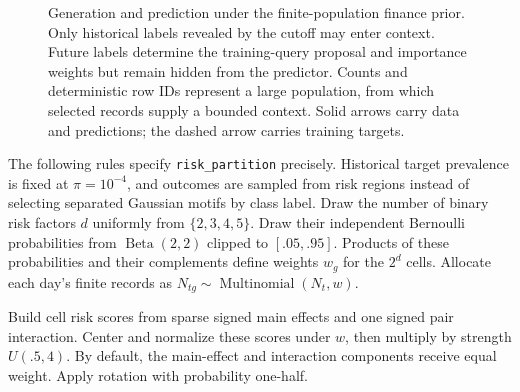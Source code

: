 \documentclass[11pt]{article}
\begin{document}
\begin{figure}[htbp]
\caption{Generation and prediction under the finite-population finance prior. Only historical labels revealed by the cutoff may enter context. Future labels determine the training-query proposal and importance weights but remain hidden from the predictor. Counts and deterministic row IDs represent a large population, from which selected records supply a bounded context. Solid arrows carry data and predictions; the dashed arrow carries training targets.}
\label{fig:finance-generation}
\end{figure}



The following rules specify \texttt{risk\_partition} precisely. Historical target prevalence is fixed at $\pi=10^{-4}$, and outcomes are sampled from risk regions instead of selecting separated Gaussian motifs by class label. Draw the number of binary risk factors $d$ uniformly from $\{2,3,4,5\}$. Draw their independent Bernoulli probabilities from $\operatorname{Beta}(2,2)$ clipped to $[.05,.95]$. Products of these probabilities and their complements define weights $w_g$ for the $2^d$ cells. Allocate each day's finite records as $N_{tg}\sim\operatorname{Multinomial}(N_t,w)$.

Build cell risk scores from sparse signed main effects and one signed pair interaction. Center and normalize these scores under $w$, then multiply by strength $U(.5,4)$. By default, the main-effect and interaction components receive equal weight. Apply rotation with probability one-half.
\end{document}
